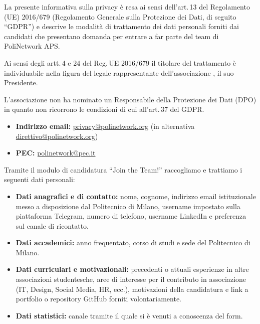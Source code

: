 \documentclass[legal]{polinetwork}
\begin{document}
\thispagestyle{firstpage}

\pnMakeHeader
\pnMakeMetadata


La presente informativa sulla privacy è resa ai sensi dell'art.\,13 del
Regolamento (UE) 2016/679 (Regolamento Generale sulla Protezione dei Dati,
di seguito ``GDPR'') e descrive le modalità di trattamento dei dati
personali forniti dai candidati che presentano domanda per entrare a far
parte del team di PoliNetwork APS.


Ai sensi degli artt.\,4 e 24 del Reg.\,UE 2016/679 il titolare del
trattamento è individuabile nella figura del legale rappresentante
dell'associazione , il suo Presidente.

L'associazione non ha nominato un Responsabile della Protezione dei Dati
(DPO) in quanto non ricorrono le condizioni di cui all'art.\,37 del GDPR.


\begin{itemize}
  \item \textbf{Indirizzo email:}
    \href{mailto:privacy@polinetwork.org}{privacy@polinetwork.org}
    (in alternativa
    \href{mailto:direttivo@polinetwork.org}{direttivo@polinetwork.org})
  \item \textbf{PEC:}
    \href{mailto:polinetwork@pec.it}{polinetwork@pec.it}
\end{itemize}


Tramite il modulo di candidatura ``Join the Team!'' raccogliamo e
trattiamo i seguenti dati personali:

\begin{itemize}
  \item \textbf{Dati anagrafici e di contatto:} nome, cognome, indirizzo
    email istituzionale messo a disposizione dal Politecnico di Milano,
    username impostato sulla piattaforma Telegram, numero di telefono,
    username LinkedIn e preferenza sul canale di ricontatto.
  \item \textbf{Dati accademici:} anno frequentato, corso di studi e sede
    del Politecnico di Milano.
  \item \textbf{Dati curriculari e motivazionali:} precedenti o attuali
    esperienze in altre associazioni studentesche, aree di interesse per
    il contributo in associazione (IT, Design, Social Media, HR, ecc.),
    motivazioni della candidatura e link a portfolio o repository GitHub
    forniti volontariamente.
  \item \textbf{Dati statistici:} canale tramite il quale si è venuti a
    conoscenza del form.
\end{itemize}
\end{document}
